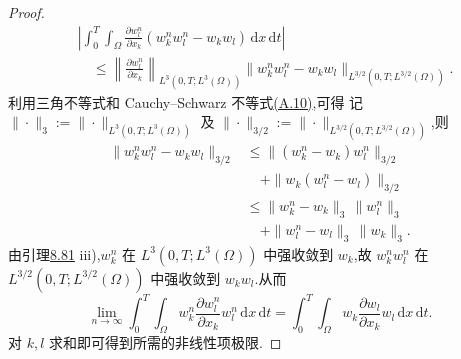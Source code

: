\begin{lemma}[两个试验函数的弱方程之差的估计]
\begin{proof}
\[
\begin{aligned}
 &\left|\int_0^T\int_\Omega
       \frac{\partial w_l^n}{\partial x_k}
          (w_k^nw_l^n-w_kw_l)\,\mathrm{d}x\,\mathrm{d}t\right|\\
 &\quad\le
   \left\|\frac{\partial w_l^n}{\partial x_k}\right\|_{L^3(0,T;L^3(\Omega))}
   \|w_k^nw_l^n-w_kw_l\|_{L^{3/2}(0,T;L^{3/2}(\Omega))}.
\end{aligned}
\]
利用三角不等式和 Cauchy--Schwarz 不等式\hyperref[eq:appendix-a-10]{(A.10)},可得
记 $\|\cdot\|_3:=\|\cdot\|_{L^3(0,T;L^3(\Omega))}$ 及
$\|\cdot\|_{3/2}:=\|\cdot\|_{L^{3/2}(0,T;L^{3/2}(\Omega))}$,则
\[
\begin{aligned}
 \|w_k^nw_l^n-w_kw_l\|_{3/2}
 &\le \|(w_k^n-w_k)w_l^n\|_{3/2}\\
 &\quad+\|w_k(w_l^n-w_l)\|_{3/2}\\
 &\le \|w_k^n-w_k\|_3\,\|w_l^n\|_3\\
 &\quad+\|w_l^n-w_l\|_3\,\|w_k\|_3.
\end{aligned}
\]
由引理\hyperref[lem:smagorinsky-convergent-subsequence]{8.81} iii),$w_k^n$ 在 $L^3(0,T;L^3(\Omega))$ 中强收敛到 $w_k$,故
$w_k^nw_l^n$ 在 $L^{3/2}(0,T;L^{3/2}(\Omega))$ 中强收敛到 $w_kw_l$.从而
\[
 \lim_{n\to\infty}\int_0^T\int_\Omega
       w_k^n\frac{\partial w_l^n}{\partial x_k}w_l^n
                                  \,\mathrm{d}x\,\mathrm{d}t
 =\int_0^T\int_\Omega
       w_k\frac{\partial w_l}{\partial x_k}w_l
                                  \,\mathrm{d}x\,\mathrm{d}t.
\]
对 $k,l$ 求和即可得到所需的非线性项极限.


\end{proof}
\end{lemma}

